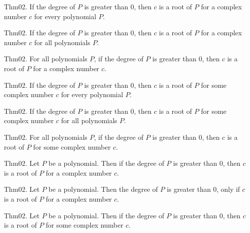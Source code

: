 \documentclass{article}
\begin{document}
Thm02. If the degree of $P$ is greater than $0$, then $c$ is a root of $P$ for a complex number $c$ for every polynomial $P$.

Thm02. If the degree of $P$ is greater than $0$, then $c$ is a root of $P$ for a complex number $c$ for all polynomials $P$.

Thm02. For all polynomials $P$, if the degree of $P$ is greater than $0$, then $c$ is a root of $P$ for a complex number $c$.

Thm02. If the degree of $P$ is greater than $0$, then $c$ is a root of $P$ for some complex number $c$ for every polynomial $P$.

Thm02. If the degree of $P$ is greater than $0$, then $c$ is a root of $P$ for some complex number $c$ for all polynomials $P$.

Thm02. For all polynomials $P$, if the degree of $P$ is greater than $0$, then $c$ is a root of $P$ for some complex number $c$.

Thm02. Let $P$ be a polynomial. Then if the degree of $P$ is greater than $0$, then $c$ is a root of $P$ for a complex number $c$.

Thm02. Let $P$ be a polynomial. Then the degree of $P$ is greater than $0$, only if $c$ is a root of $P$ for a complex number $c$.

Thm02. Let $P$ be a polynomial. Then if the degree of $P$ is greater than $0$, then $c$ is a root of $P$ for some complex number $c$.
\end{document}
